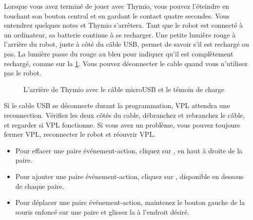 

Lorsque vous avez terminé de jouer avec Thymio, vous pouvez l'éteindre en touchant son bouton central et en gardant le contact quatre secondes.
Vous entendrez quelques notes et Thymio s'arrêtera.
Tant que le robot est connecté à un ordinateur, sa batterie continue à se recharger. Une petite lumière rouge à l'arrière du robot, juste à côté du câble USB, permet de savoir s'il est rechargé ou pas. La lumière passe du rouge au bleu pour indiquer qu'il est complètement rechargé, comme sur la \cref{fig.back}.
Vous pouvez déconnecter le cable quand vous n'utilisez pas le robot.


\begin{figure}[h]
\begin{center}
\caption{L'arrière de Thymio avec le câble microUSB et le témoin de charge}\label{fig.back}
\end{center}
\end{figure}

Si le cable USB se déconnecte durant la programmation, VPL attendra une reconnection.
Vérifiez les deux côtés du cable, débranchez et rebranchez le câble, et regarder si VPL fonctionne.
Si vous avez un problème, vous pouvez toujours fermer VPL, reconnecter le robot et réouvrir VPL.


\begin{itemize}
\item Pour effacer une paire événement-action, cliquez sur , en haut à droite de la paire.
\item Pour ajouter une paire événement-action, cliquez sur , disponible en dessous de chaque paire.
\item Pour déplacer une paire événement-action, maintenez le bouton gauche de la souris enfoncé sur une paire et glissez la à l'endroit désiré.
\end{itemize}


